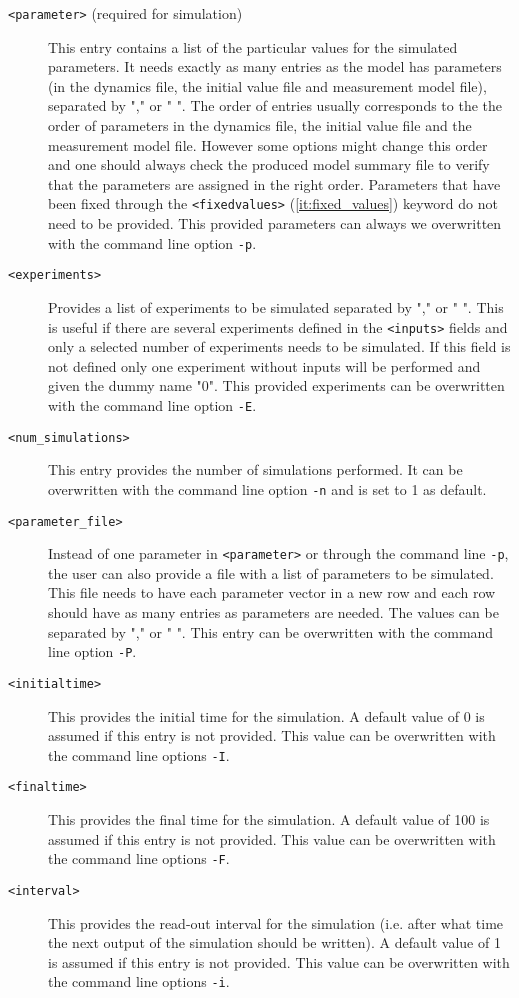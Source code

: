 \documentclass[11pt]{article} %
\begin{document}
\begin{description}
\item[\texttt{<parameter>} (required for simulation)] This entry contains a list of the particular values for the simulated parameters. It needs exactly as many entries as the model has parameters (in the dynamics file, the initial value file and measurement model file), separated by "," or " ". The order of entries usually corresponds to the the order of parameters in the dynamics file, the initial value file and the measurement model file. However some options might change this order and one should always check the produced model summary file to verify that the parameters are assigned in the right order. 
Parameters that have been fixed through the \texttt{<fixedvalues>} (\ref{it:fixed_values}) keyword do not need to be provided. This provided parameters can always we overwritten with the command line option \texttt{-p}. 
\item[\texttt{<experiments>}] Provides a list of experiments to be simulated separated by "," or " ". This is useful if there are several experiments defined in the \texttt{<inputs>} fields and only a selected number of experiments needs to be simulated. If this field is not defined only one experiment without inputs will be performed and given the dummy name "0". This provided experiments can be overwritten with the command line option \texttt{-E}. 
\item[\texttt{<num\_simulations>}] This entry provides the number of simulations performed. It can be overwritten with the command line option \texttt{-n} and is set to 1 as default. 
\item[\texttt{<parameter\_file>}] Instead of one parameter in \texttt{<parameter>} or through the command line \texttt{-p}, the user can also provide a file with a list of parameters to be simulated. This file needs to have each parameter vector in a new row and each row should have as many entries as parameters are needed. The values can be separated by "," or " ". This entry can be overwritten with the command line option \texttt{-P}. 
\item[\texttt{<initialtime>}] This provides the initial time for the simulation. A default value of 0 is assumed if this entry is not provided. This value can be overwritten with the command line options \texttt{-I}. 
\item[\texttt{<finaltime>}] This provides the final time for the simulation. A default value of 100 is assumed if this entry is not provided. This value can be overwritten with the command line options \texttt{-F}. 
\item[\texttt{<interval>}] This provides the read-out interval for the simulation (i.e. after what time the next output of the simulation should be written). A default value of 1 is assumed if this entry is not provided. This value can be overwritten with the command line options \texttt{-i}. 
\end{description}
\end{document}
